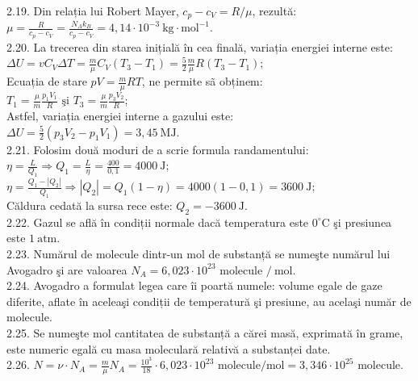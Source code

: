 2.19. Din relația lui Robert Mayer, $c_{p}-c_{V}=R / \mu$, rezultă:\\ $\mu=\frac{R}{c_{p}-c_{V}}=\frac{N_{A} k_{B}}{c_{p}-c_{V}}=4,14 \cdot 10^{-3} \mathrm{~kg} \cdot \mathrm{mol}^{-1}$.\\

2.20. La trecerea din starea inițială în cea finală, variația energiei interne este:\\ $\Delta U=v C_{V} \Delta T=\frac{m}{\mu} C_{V}\left(T_{3}-T_{1}\right)=\frac{5}{2} \frac{m}{\mu} R\left(T_{3}-T_{1}\right)$;\\ Ecuația de stare $p V=\frac{m}{\mu} R T$, ne permite sã obținem:\\ $T_{1}=\frac{\mu}{m} \frac{p_{1} V_{1}}{R} \text { şi } T_{3}=\frac{\mu}{m} \frac{p_{3} V_{2}}{R}$;\\ Astfel, variația energiei interne a gazului este:\\ $\Delta U=\frac{5}{2}\left(p_{3} V_{2}-p_{1} V_{1}\right)=3,45 \mathrm{~MJ}$.\\

2.21. Folosim două moduri de a scrie formula randamentului:\\ $\eta=\frac{L}{Q_{1}} \Rightarrow Q_{1}=\frac{L}{\eta}=\frac{400}{0,1}=4000 \mathrm{~J}$;\\ $\eta=\frac{Q_{1}-\left|Q_{2}\right|}{Q_{1}} \Rightarrow\left|Q_{2}\right|=Q_{1}(1-\eta)=4000(1-0,1)=3600 \mathrm{~J}$;\\ Căldura cedată la sursa rece este: $Q_{2}=-3600 \mathrm{~J}$.\\

2.22. Gazul se află în condiții normale dacă temperatura este $0^{\circ} \mathrm{C}$ şi presiunea este $1 \mathrm{~atm}$.\\

2.23. Numărul de molecule dintr-un mol de substanță se numeşte numărul lui Avogadro şi are valoarea $N_{A}=6,023 \cdot 10^{23}$ molecule $/ \mathrm{~mol}$.\\

2.24. Avogadro a formulat legea care îi poartă numele: volume egale de gaze diferite, aflate în aceleaşi condiții de temperatură şi presiune, au acelaşi număr de molecule.\\

2.25. Se numeşte mol cantitatea de substanță a cărei masă, exprimată în grame, este numeric egală cu masa moleculară relativă a substanței date.\\

2.26. $N=\nu \cdot N_{A}=\frac{m}{\mu} N_{A}=\frac{10^{3}}{18} \cdot 6,023 \cdot 10^{23} \text { molecule} / \mathrm{mol}= 3,346 \cdot 10^{25}$ molecule.\\

